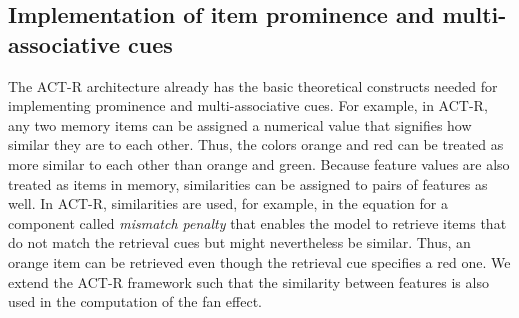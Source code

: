 \documentclass{cambridge7A}\usepackage[]{graphicx}\usepackage[]{color}
\begin{document}















\subsection{Implementation of item prominence and multi-associative cues}
\label{sec:impl}

The ACT-R architecture already has the basic theoretical constructs needed for implementing  prominence and  multi-associative cues.
For example, in ACT-R, any two memory items can be assigned a numerical value that signifies how similar they are to each other. Thus, the colors orange and red can be treated as more similar to each other than orange and green. Because feature values  are also treated as items in memory, similarities can be assigned to pairs of features as well.
In ACT-R, similarities are used, for example, in the equation for a component called  \emph{mismatch penalty} that enables the model to retrieve items that do not match the retrieval cues but might nevertheless be similar. Thus, an orange item can be retrieved even though the retrieval cue specifies a red one.
We extend the ACT-R framework such that the similarity between features is also used in the computation of the fan effect. 
\end{document}
